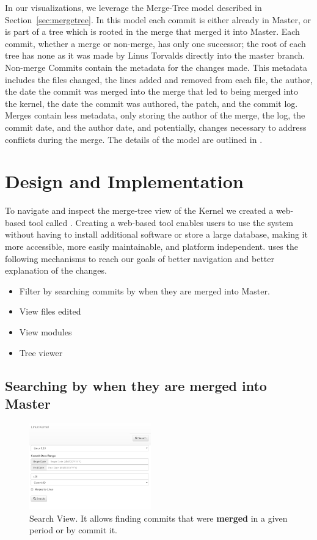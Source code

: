 \documentclass[conference, draftclsnofoot, draft]{IEEEtran}
\begin{document}
In our visualizations, we leverage the Merge-Tree model described in
Section~\ref{sec:mergetree}. In this model each commit is either already in Master,
or is part of a tree which is rooted in the merge that merged it into Master.  Each
commit, whether a merge or non-merge, has only one successor; the root of each tree
has none as it was made by Linus Torvalds directly into the master branch. Non-merge
Commits contain the metadata for the changes made. This metadata includes the files
changed, the lines added and removed from each file, the author, the date the commit
was merged into the merge that led to being merged into the kernel, the date the
commit was authored, the patch, and the commit log. Merges contain less metadata,
only storing the author of the merge, the log, the commit date, and the author date,
and potentially, changes necessary to address conflicts during the merge. The
details of the model are outlined in \cite{German2015}.

\section{Design and Implementation}

To navigate and inspect the merge-tree view of the Kernel we created a web-based
tool called \tool. Creating a web-based tool enables users to use the system without
having to install additional software or store a large database, making it more
accessible, more easily maintainable, and platform independent. \tool uses the
following mechanisms to reach our goals of better navigation and better explanation
of the changes.

\begin{itemize}
        \item Filter by searching commits by when they are merged into Master.
        \item View files edited
        \item View modules
        \item Tree viewer
\end{itemize}


\subsection{Searching by when they are merged into Master}


\begin{figure}
        \centering
        \includegraphics[width=0.47\textwidth]{figures/search.png}
        \caption{Search View. It allows finding commits that were \textbf{merged} in a given period or by commit it.}
        \label{fig:search}
\end{figure}
\end{document}
